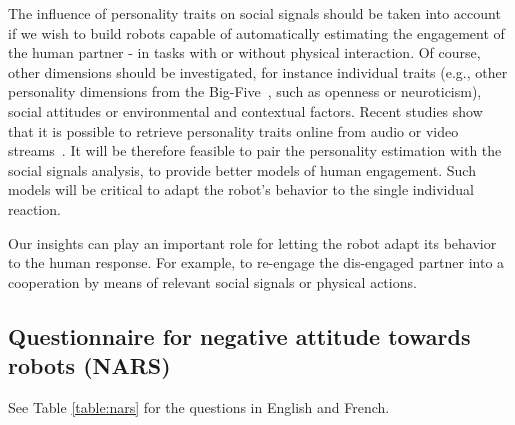 The influence of personality traits on social signals should be taken into account if we wish to build robots capable of automatically estimating the engagement of the human partner - in tasks with or without physical interaction.
Of course, other dimensions should be investigated, for instance individual traits (e.g., other personality dimensions from the Big-Five~\cite{BIGFIVE}, such as openness or neuroticism), social attitudes or environmental and contextual factors. 
Recent studies show that it is possible to retrieve personality traits online from audio or video streams~\cite{mohammadi2012automatic}. 
It will be therefore feasible to pair the personality estimation with the social signals analysis, to provide better models of human engagement. Such models will be critical to adapt the robot's behavior to the single individual reaction.

Our insights can play an important role for letting the robot adapt its behavior to the human response. For example, to re-engage the dis-engaged partner into a cooperation by means of relevant social signals or physical actions.


\subsection{Questionnaire for negative attitude towards robots (NARS)}\label{appendix:nars}

See Table \ref{table:nars} for the questions in English and French.

